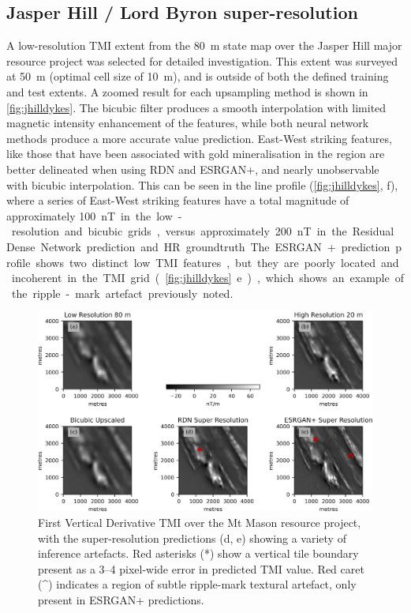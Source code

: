 \documentclass[manuscript.tex]{subfiles}
\begin{document}
\subsection{Jasper Hill / Lord Byron super-resolution}
A low-resolution TMI extent from the \SI{80}{\metre} state map over the Jasper Hill major resource project was selected for detailed investigation.
This extent was surveyed at \SI{50}{\metre} (optimal cell size of \SI{10}{\metre}), and is outside of both the defined training and test extents.
A zoomed result for each upsampling method is shown in \cref{fig:jhilldykes}.
The bicubic filter produces a smooth interpolation with limited magnetic intensity enhancement of the features, while both neural network methods produce a more accurate value prediction.
East-West striking features, like those that have been associated with gold mineralisation in the region \parencite[p.~283]{salierTimingSourceGoldbearing2003} are better delineated when using RDN\textdaggerdbl{} and ESRGAN+, and nearly unobservable with bicubic interpolation.
This can be seen in the line profile (\cref{fig:jhilldykes}, f), where a series of East-West striking features have a total magnitude of approximately \SI{100}nT in the low-resolution and bicubic grids, versus approximately \SI{200}nT in the Residual Dense Network prediction and HR groundtruth.
The ESRGAN+ prediction profile shows two distinct low TMI features, but they are poorly located and incoherent in the TMI grid (\cref{fig:jhilldykes} e), which shows an example of the ripple-mark artefact previously noted.

\begin{figure}[hbt]
    \includegraphics[width=\linewidth,trim={0 0 0 0},clip]{fig/p1/jhillvis.jpg}
    \caption[First Vertical Derivative SR TMI over the Mt Mason resource project]{First Vertical Derivative TMI over the Mt Mason resource project, with the super-resolution predictions (d, e) showing a variety of inference artefacts.
    Red asterisks (*) show a vertical tile boundary present as a 3--4 pixel-wide error in predicted TMI value.
    Red caret (\^{ }) indicates a region of subtle ripple-mark textural artefact, only present in ESRGAN+ predictions.
    }
    \label{fig:jhillvis}
\end{figure}
\end{document}
